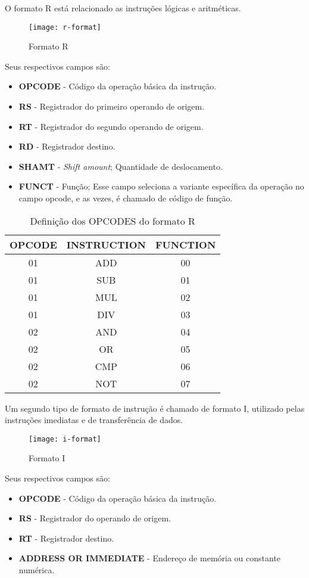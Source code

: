 	O formato R está relacionado as instruções lógicas e aritméticas.
	\begin{figure}[H]
    	\centering
    	\texttt{[image: r-format]}
    	\caption{Formato R}
		\label{r_format}
	\end{figure}
	Seus respectivos campos são:
	\begin{itemize}
	\item \textbf{OPCODE} - Código da operação básica da instrução.
	\item \textbf{RS} - Registrador do primeiro operando de origem.
	\item \textbf{RT} - Registrador do segundo operando de origem.
	\item \textbf{RD} - Registrador destino.
	\item \textbf{SHAMT} - \textit{Shift amount}; Quantidade de deslocamento.
	\item \textbf{FUNCT} - Função; Esse campo seleciona a variante específica da operação no campo opcode, e as vezes, é chamado de código de função.
\end{itemize}	

\begin{table}[H]
\centering
	\begin{tabular}{|c|c|c|}
  	\hline 
  	\textbf{OPCODE} & \textbf{INSTRUCTION} & \textbf{FUNCTION} \\ 
  	\hline 
  	01 & ADD & 00 \\ 
  	\hline 
  	01 & SUB & 01 \\ 
  	\hline 
  	01 & MUL & 02 \\ 
  	\hline 
  	01 & DIV & 03 \\ 
  	\hline 
  	02 & AND & 04 \\ 
  	\hline 
  	02 & OR & 05 \\ 
  	\hline 
  	02 & CMP & 06 \\ 
  	\hline 
  	02 & NOT & 07 \\ 
  	\hline 
  	\end{tabular} 
  	\caption{Definição dos OPCODES do formato R}
  \end{table} 
  	 	
  	
	 Um segundo tipo de formato de instrução é chamado de formato I, utilizado pelas instruções imediatas e de transferência de dados.
	\begin{figure}[H]
    	\centering
    	\texttt{[image: i-format]}
    	\caption{Formato I}
		\label{i_format}
  	\end{figure}
Seus respectivos campos são:
	\begin{itemize}
	\item \textbf{OPCODE} - Código da operação básica da instrução.
	\item \textbf{RS} - Registrador do operando de origem.
	\item \textbf{RT} - Registrador destino.
	\item \textbf{ADDRESS OR IMMEDIATE} - Endereço de memória ou constante numérica.
\end{itemize}	  	


